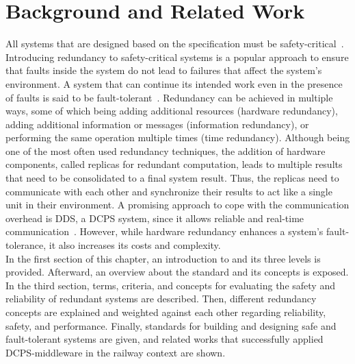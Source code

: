  \chapter{Background and Related Work}
\label{chptr:concepts}

All systems that are designed based on the  specification must be safety-critical~\cite{OnBoardUnitSafetyTesting}. 
Introducing redundancy to safety-critical systems is a popular approach to ensure that faults inside the system do not lead to failures that affect the system's environment.
A system that can continue its intended work even in the presence of faults is said to be fault-tolerant~\cite{BarryFaultToleranceAnalysis}.
Redundancy can be achieved in multiple ways, some of which being adding additional resources (hardware redundancy), adding additional information or messages (information redundancy), or performing the same operation multiple times (time redundancy).
Although being one of the most often used redundancy techniques, the addition of hardware components, called replicas for redundant computation, leads to multiple results that need to be consolidated to a final system result.
Thus, the replicas need to communicate with each other and synchronize their results to act like a single unit in their environment.
A promising approach to cope with the communication overhead is \gls*{DDS}, a \gls*{DCPS} system, since it allows reliable and real-time communication~\cite{omgDDSspec}.
However, while hardware redundancy enhances a system's fault-tolerance, it also increases its costs and complexity.
\\

In the first section of this chapter, an introduction to  and its three levels is provided.
Afterward, an overview about the  standard and its concepts is exposed.
In the third section, terms, criteria, and concepts for evaluating the safety and reliability of redundant systems are described.
Then, different redundancy concepts are explained and weighted against each other regarding reliability, safety, and performance.
Finally, standards for building and designing safe and fault-tolerant systems are given, and related works that successfully applied \gls*{DCPS}-middleware in the railway context are shown.

